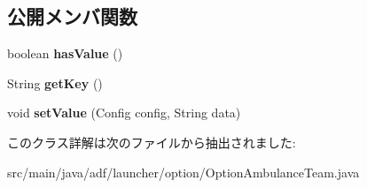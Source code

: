 \subsection*{公開メンバ関数}
\begin{DoxyCompactItemize}
\item 
\hypertarget{classadf_1_1launcher_1_1option_1_1OptionAmbulanceTeam_a73e78e0e360656e923347cfab4f07bda}{}\label{classadf_1_1launcher_1_1option_1_1OptionAmbulanceTeam_a73e78e0e360656e923347cfab4f07bda} 
boolean {\bfseries has\+Value} ()
\item 
\hypertarget{classadf_1_1launcher_1_1option_1_1OptionAmbulanceTeam_a0aa64e1f9f3fb5223e36523bb1bbd379}{}\label{classadf_1_1launcher_1_1option_1_1OptionAmbulanceTeam_a0aa64e1f9f3fb5223e36523bb1bbd379} 
String {\bfseries get\+Key} ()
\item 
\hypertarget{classadf_1_1launcher_1_1option_1_1OptionAmbulanceTeam_a715b5524090e6b461afe193bdd7381b4}{}\label{classadf_1_1launcher_1_1option_1_1OptionAmbulanceTeam_a715b5524090e6b461afe193bdd7381b4} 
void {\bfseries set\+Value} (Config config, String data)
\end{DoxyCompactItemize}


このクラス詳解は次のファイルから抽出されました\+:\begin{DoxyCompactItemize}
\item 
src/main/java/adf/launcher/option/Option\+Ambulance\+Team.\+java\end{DoxyCompactItemize}
